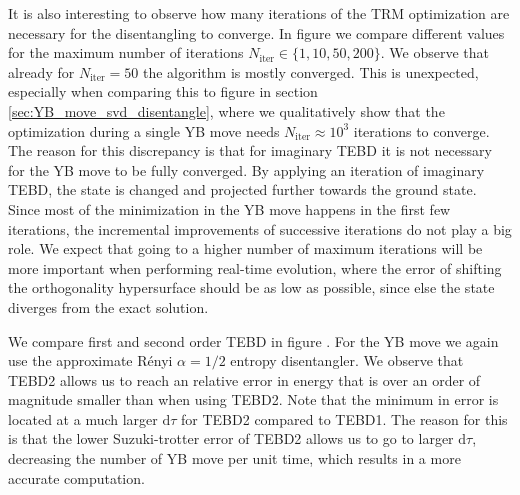 
It is also interesting to observe how many iterations of the TRM optimization are necessary for the disentangling to converge. In figure  we compare different values for the maximum number of iterations $N_\text{iter} \in \{1, 10, 50, 200\}$. We observe that already for $N_\text{iter} = 50$ the algorithm is mostly converged. This is unexpected, especially when comparing this to figure  in section \ref{sec:YB_move_svd_disentangle}, where we qualitatively show that the optimization during a single YB move needs $N_\text{iter} \approx 10^{3}$ iterations to converge. The reason for this discrepancy is that for imaginary TEBD it is not necessary for the YB move to be fully converged. By applying an iteration of imaginary TEBD, the state is changed and projected further towards the ground state. Since most of the minimization in the YB move happens in the first few iterations, the incremental improvements of successive iterations do not play a big role. We expect that going to a higher number of maximum iterations will be more important when performing real-time evolution, where the error of shifting the orthogonality hypersurface should be as low as possible, since else the state diverges from the exact solution. \par

We compare first and second order TEBD in figure . For the YB move we again use the approximate Rényi $\alpha=1/2$ entropy disentangler. We observe that TEBD2 allows us to reach an relative error in energy that is over an order of magnitude smaller than when using TEBD2. Note that the minimum in error is located at a much larger $\text{d}\tau$ for TEBD2 compared to TEBD1. The reason for this is that the lower Suzuki-trotter error of TEBD2 allows us to go to larger $\text{d}\tau$, decreasing the number of YB move per unit time, which results in a more accurate computation. \par



